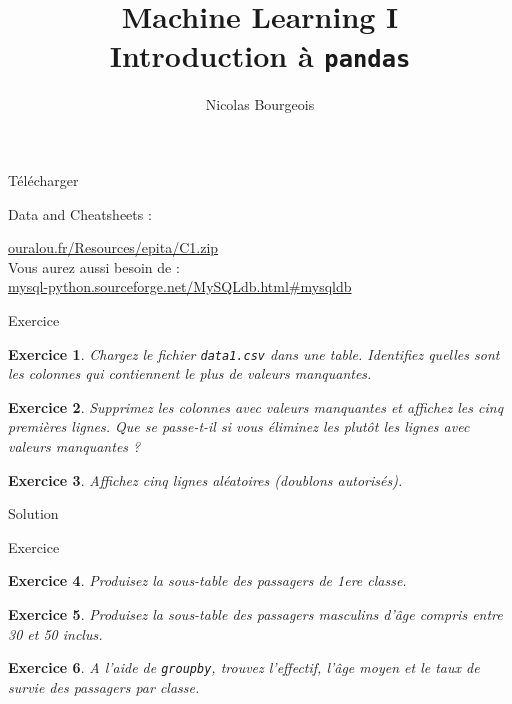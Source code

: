 \documentclass[11pt]{beamer}
\title{Machine Learning I \\ Introduction à \texttt{pandas}}
\author{Nicolas Bourgeois}
\date{}
\newtheorem{exercice}{Exercice}
\newcommand{\Python}[1]{
	{\small	}
}
\begin{document}
\begin{frame}
\maketitle
\end{frame}

\begin{frame}{Télécharger}

Data and Cheatsheets :\\
\vspace{0.3cm}

\url{ouralou.fr/Resources/epita/C1.zip}\\
\vspace{0.3cm}
Vous aurez aussi besoin de :\\
\vspace{0.3cm}
\url{mysql-python.sourceforge.net/MySQLdb.html\#mysqldb}

\end{frame}


\begin{frame}{Exercice}
\begin{exercice}
Chargez le fichier \texttt{data1.csv} dans une table. Identifiez quelles sont les colonnes qui contiennent le plus de valeurs manquantes.
\end{exercice}

\begin{exercice}
Supprimez les colonnes avec valeurs manquantes et affichez les cinq premières lignes. Que se passe-t-il si vous éliminez les plutôt les lignes avec valeurs manquantes ?
\end{exercice}

\begin{exercice}
Affichez cinq lignes aléatoires (doublons autorisés).
\end{exercice}
\end{frame}

\begin{frame}{Solution}
\Python{ex101}
\end{frame}


\begin{frame}{Exercice}
\begin{exercice}
Produisez la sous-table des passagers de 1ere classe.
\end{exercice}
\begin{exercice}
Produisez la sous-table des passagers masculins d'âge compris entre 30 et 50 inclus.
\end{exercice}
\begin{exercice}
A l'aide de \texttt{groupby}, trouvez l'effectif, l'âge moyen et le taux de survie des passagers par classe.
\end{exercice}
\end{frame}
\end{document}
